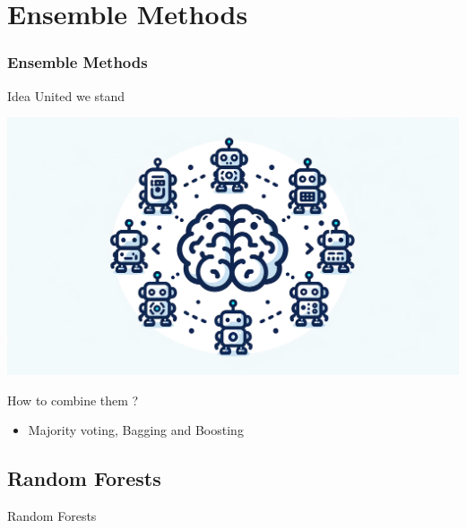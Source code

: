 \documentclass[11pt]{beamer}
\begin{document}
\section{Ensemble Methods}
\begin{frame}
  \frametitle{Ensemble Methods}
  \begin{block}{Idea}
    United we stand
    \begin{center}

    \includegraphics[width=.7\textwidth]{ensemble_principle}
    \end{center}
  \end{block}
  \begin{block}{How to combine them ?}
    
  \begin{itemize}
  \item Majority voting,  Bagging and  Boosting
  \end{itemize}
    \end{block}

\end{frame}


\subsection{Random Forests}
\begin{frame}[plain]

  \begin{center}
    \Huge{Random Forests}
    \end{center}
  
\end{frame}
\end{document}
